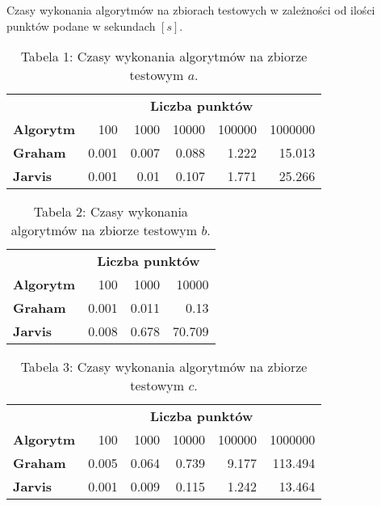 \quad Czasy wykonania algorytmów na zbiorach testowych w zależności od ilości punktów podane w sekundach $[s]$.
\renewcommand{\arraystretch}{2}
\begin{table}[!ht]
    \centering
\begin{tabular}{l  r|r|r|r|r|}
    & \multicolumn{5}{c}{\textbf{Liczba punktów}} \\ \cline{2-6}     
    \multicolumn{1}{l|}{\textbf{Algorytm}} & 100& 1000& 10000& 100000& 1000000 \\
   \hline
   \hline
   \multicolumn{1}{l|}{\textbf{Graham}} & 0.001& 0.007& 0.088& 1.222& 15.013 \\
   \hline
   \multicolumn{1}{l|}{\textbf{Jarvis}} & 0.001& 0.01& 0.107& 1.771& 25.266 \\
   \cline{2-6}
\end{tabular}
\caption*{Tabela 1: Czasy wykonania algorytmów na zbiorze testowym $a$.}
\end{table}


\begin{table}[!ht]
    \centering
\begin{tabular}{l  r|r|r|}
    & \multicolumn{3}{c}{\textbf{Liczba punktów}} \\ \cline{2-4}     
    \multicolumn{1}{l|}{\textbf{Algorytm}} & 100& 1000& 10000 \\
   \hline
   \hline
   \multicolumn{1}{l|}{\textbf{Graham}} & 0.001& 0.011& 0.13 \\
   \hline
   \multicolumn{1}{l|}{\textbf{Jarvis}} & 0.008& 0.678& 70.709 \\
   \cline{2-4}
\end{tabular}
\caption*{Tabela 2: Czasy wykonania algorytmów na zbiorze testowym $b$.}
\end{table}


\begin{table}[!ht]
    \centering
\begin{tabular}{l  r|r|r|r|r|}
    & \multicolumn{5}{c}{\textbf{Liczba punktów}} \\ \cline{2-6}     
    \multicolumn{1}{l|}{\textbf{Algorytm}} & 100& 1000& 10000& 100000& 1000000 \\
   \hline
   \hline
   \multicolumn{1}{l|}{\textbf{Graham}} & 0.005& 0.064& 0.739& 9.177& 113.494 \\
   \hline
   \multicolumn{1}{l|}{\textbf{Jarvis}} & 0.001& 0.009& 0.115& 1.242& 13.464 \\
   \cline{2-6}
\end{tabular}
\caption*{Tabela 3: Czasy wykonania algorytmów na zbiorze testowym $c$.}
\end{table}


